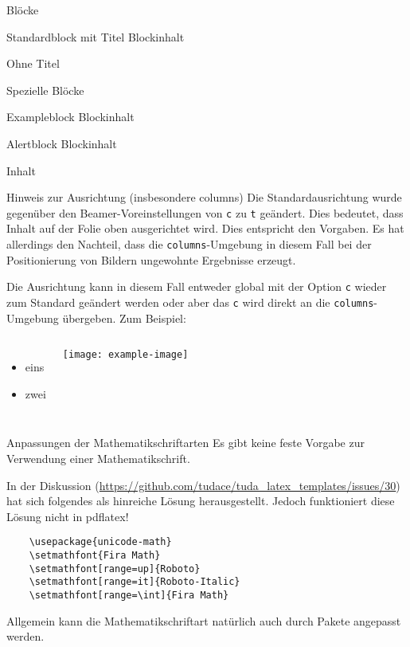 \documentclass[
	german,%
	aspectratio=169,%
	accentcolor=2d,%
	logo=false,%
	colorframetitle=true,%
	design=2008,  %
]{tudabeamer}
\let\code\texttt
\begin{document}
\begin{frame}{Blöcke}
	\begin{block}{Standardblock mit Titel}
		Blockinhalt
	\end{block}
	\begin{block}{}
		Ohne Titel
	\end{block}
\end{frame}

\begin{frame}{Spezielle Blöcke}
	\begin{exampleblock}{Exampleblock}
		Blockinhalt
	\end{exampleblock}
	\begin{alertblock}{Alertblock}
		Blockinhalt
	\end{alertblock}
	\begin{example}
		Inhalt
	\end{example}
\end{frame}

\begin{frame}{Hinweis zur Ausrichtung (insbesondere columns)}
	Die Standardausrichtung wurde gegenüber den Beamer-Voreinstellungen von \code{c} zu \code{t} geändert. Dies bedeutet, dass Inhalt auf der Folie oben ausgerichtet wird. Dies entspricht den Vorgaben. Es hat allerdings den Nachteil, dass die \code{columns}-Umgebung in diesem Fall bei der Positionierung von Bildern ungewohnte Ergebnisse erzeugt.

	Die Ausrichtung kann in diesem Fall entweder global mit der Option \code{c} wieder zum Standard geändert werden oder aber das \code{c} wird direkt an die \code{columns}-Umgebung übergeben. Zum Beispiel:
	\begin{columns}[onlytextwidth,c]%
		\begin{itemize}
			\item eins
			\item zwei
		\end{itemize}
		\texttt{[image: example-image]}
	\end{columns}
\end{frame}


\begin{frame}[fragile]{Anpassungen der Mathematikschriftarten}
	Es gibt keine feste Vorgabe zur Verwendung einer Mathematikschrift.

	In der Diskussion (\url{https://github.com/tudace/tuda_latex_templates/issues/30}) hat sich folgendes als hinreiche Lösung herausgestellt. Jedoch funktioniert diese Lösung nicht in pdflatex!
\begin{verbatim}
	\usepackage{unicode-math}
	\setmathfont{Fira Math}
	\setmathfont[range=up]{Roboto}
	\setmathfont[range=it]{Roboto-Italic}
	\setmathfont[range=\int]{Fira Math}
\end{verbatim}
	Allgemein kann die Mathematikschriftart natürlich auch durch Pakete angepasst werden.
\end{frame}
\end{document}
